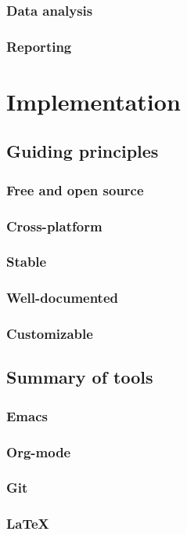 \documentclass[11pt]{book}
\begin{document}
\section{Data analysis}
\label{sec-1-3-4}
\section{Reporting}
\label{sec-1-3-5}
\part{Implementation}
\label{sec-2}
\chapter{Guiding principles}
\label{sec-2-1}
\section{Free and open source}
\label{sec-2-1-1}
\section{Cross-platform}
\label{sec-2-1-2}
\section{Stable}
\label{sec-2-1-3}
\section{Well-documented}
\label{sec-2-1-4}
\section{Customizable}
\label{sec-2-1-5}
\chapter{Summary of tools}
\label{sec-2-2}
\section{Emacs}
\label{sec-2-2-1}
\section{Org-mode}
\label{sec-2-2-2}
\section{Git}
\label{sec-2-2-3}
\section{\LaTeX{}}
\label{sec-2-2-4}
\end{document}
